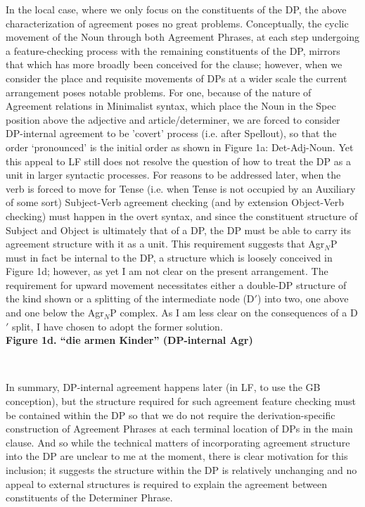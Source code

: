 \documentclass[12pt]{article}
\begin{document}
\begin{flushleft}
In the local case, where we only focus on the constituents of the DP, the above characterization of agreement poses no great problems. Conceptually, the cyclic movement of the Noun through both Agreement Phrases, at each step undergoing a feature-checking process with the remaining constituents of the DP,  mirrors that which has more broadly been conceived for the clause; however, when we consider the place and requisite movements of DPs at a wider scale the current arrangement poses notable problems. For one, because of the nature of Agreement relations in Minimalist syntax, which place the Noun in the Spec position above the adjective and article/determiner, we are forced to consider DP-internal agreement to be 'covert' process (i.e. after Spellout), so that the order `pronounced' is the initial order as shown in Figure 1a: Det-Adj-Noun. Yet this appeal to LF still does not resolve the question of how to treat the DP as a unit in larger syntactic processes. For reasons to be addressed later, when the verb is forced to move for Tense (i.e. when Tense is not occupied by an Auxiliary of some sort) Subject-Verb agreement checking (and by extension Object-Verb checking) must happen in the overt syntax, and since the constituent structure of Subject and Object is ultimately that of a DP, the DP must be able to carry its agreement structure with it as a unit. This requirement suggests that Agr$_N$P must in fact be internal to the DP, a structure which is loosely conceived in Figure 1d; however, as yet I am not clear on the present arrangement. The requirement for upward movement necessitates either a double-DP structure of the kind shown or a splitting of the intermediate node (D$'$) into two, one above and one below the Agr$_N$P complex. As I am less clear on the consequences of a D$'$ split, I have chosen to adopt the former solution. \\
\bigskip 
{\bf Figure 1d. ``die armen Kinder'' (DP-internal Agr)} \\
\bigskip
{\centering
{}\\
}
\bigskip
In summary, DP-internal agreement happens later (in LF, to use the GB conception), but the structure required for such agreement feature checking must be contained within the DP so that we do not require the derivation-specific construction of Agreement Phrases at each terminal location of DPs in the main clause. And so while the technical matters of incorporating agreement structure into the DP are unclear to me at the moment, there is clear motivation for this inclusion; it suggests the structure within the DP is relatively unchanging and no appeal to external structures is required to explain the agreement between constituents of the Determiner Phrase.\\

\end{flushleft}
\end{document}

